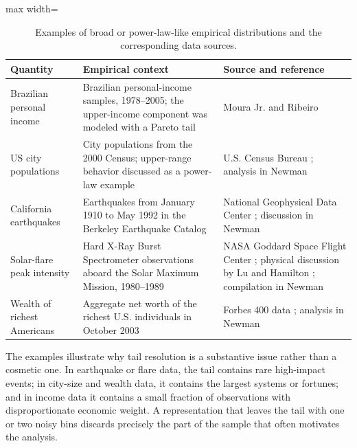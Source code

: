 \begin{table}[htbp]
\centering
\caption{Examples of broad or power-law-like empirical distributions and the corresponding data sources.}
\label{tab:empirical-examples}
\begin{adjustbox}{max width=\textwidth}
\begin{tabular}{p{}p{}p{}}
\toprule
Quantity & Empirical context & Source and reference \\
\midrule
Brazilian personal income & Brazilian personal-income samples, 1978--2005; the upper-income component was modeled with a Pareto tail & Moura Jr. and Ribeiro \cite{MouraRibeiro2009} \\
\addlinespace[0.45em]
US city populations & City populations from the 2000 Census; upper-range behavior discussed as a power-law example & U.S. Census Bureau \cite{USCensus2000}; analysis in Newman \cite{Newman2005} \\
\addlinespace[0.45em]
California earthquakes & Earthquakes from January 1910 to May 1992 in the Berkeley Earthquake Catalog & National Geophysical Data Center \cite{NOAANGDC}; discussion in Newman \cite{Newman2005} \\
\addlinespace[0.45em]
Solar-flare peak intensity & Hard X-Ray Burst Spectrometer observations aboard the Solar Maximum Mission, 1980--1989 & NASA Goddard Space Flight Center \cite{NASASMM}; physical discussion by Lu and Hamilton \cite{LuHamilton1991}; compilation in Newman \cite{Newman2005} \\
\addlinespace[0.45em]
Wealth of richest Americans & Aggregate net worth of the richest U.S. individuals in October 2003 & Forbes 400 data \cite{Forbes2003}; analysis in Newman \cite{Newman2005} \\
\bottomrule
\end{tabular}
\end{adjustbox}
\end{table}

The examples illustrate why tail resolution is a substantive issue rather than a cosmetic one. In earthquake or flare data, the tail contains rare high-impact events; in city-size and wealth data, it contains the largest systems or fortunes; and in income data it contains a small fraction of observations with disproportionate economic weight. A representation that leaves the tail with one or two noisy bins discards precisely the part of the sample that often motivates the analysis.

